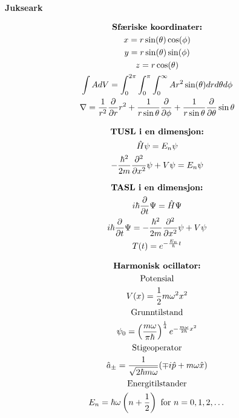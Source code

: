 \documentclass[8pt, A4paper, norsk]{extarticle}
\begin{document}
	\begin{center}
\Large \textbf{Jukseark}
	\end{center}
	\begin{multicols*}{3}
		\begin{gather*}
\text{\textbf{Sfæriske koordinater:}} \\
x = r \sin(\theta) \cos(\phi) \\
y = r \sin(\theta) \sin(\phi) \\
z = r \cos(\theta) \\
\int A dV = \int_{0}^{2 \pi} \int_{0}^{\pi} \int_{0}^{\infty} A r^2 \sin(\theta) dr d\theta d\phi \\
\nabla = \frac{1}{r^2} \frac{\partial}{\partial r} r^2 + \frac{1}{r \sin \theta} \frac{\partial}{\partial \phi} + \frac{1}{r \sin \theta} \frac{\partial}{\partial \theta} \sin \theta
		\end{gather*}

		\begin{gather*}
\text{\textbf{TUSL i en dimensjon:}} \\
\hat{H} \psi = E_n \psi \\
- \frac{\hbar^2}{2m} \frac{\partial^2}{\partial x^2} \psi + V \psi = E_n \psi
		\end{gather*}

		\begin{gather*}
\text{\textbf{TASL i en dimensjon:}} \\
i \hbar \frac{\partial}{\partial t} \Psi = \hat{H} \Psi \\
i \hbar \frac{\partial}{\partial t} \Psi = - \frac{\hbar^2}{2m} \frac{\partial^2}{\partial x^2} \psi + V \psi \\
T(t) = e^{- \frac{E_n}{\hbar}t}
		\end{gather*}

		\begin{gather*}
\text{\textbf{Harmonisk ocillator:}} \\
\text{Potensial} \\
V(x) = \frac{1}{2} m \omega^2 x^2 \\
\text{Grunntilstand} \\
\psi_0 = \left( \frac{m \omega}{\pi \hbar} \right)^{\frac{1}{4}} e^{- \frac{m \omega}{2 \hbar} x^2} \\
\text{Stigeoperator} \\
\hat{a}_{\pm} = \frac{1}{\sqrt{2 \hbar m \omega}} (\mp i \hat{p} + m \omega \hat{x}) \\
\text{Energitilstander} \\
E_n = \hbar \omega \left( n + \frac{1}{2} \right) \text{ for $n = 0, 1, 2, \dots$}
		\end{gather*}


\end{multicols*}
\end{document}
